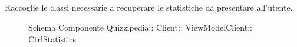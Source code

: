 \subsection{}
Raccoglie le classi necessarie a recuperare le statistiche da presentare all'utente.
\begin{figure}[H]
\centering
\noindent{}
\caption[Schema Componente CtrlStatistics]{Schema Componente Quizzipedia:: Client:: ViewModelClient:: CtrlStatistics}
\end{figure}
